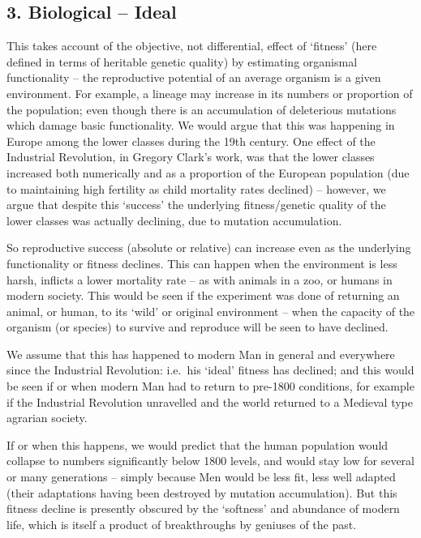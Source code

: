 \documentclass[
]{book}
\begin{document}
\hypertarget{biological-ideal}{%
\subsection*{3. Biological -- Ideal}\label{biological-ideal}}

This takes account of the objective, not differential, effect of `fitness' (here defined in terms of heritable genetic quality) by estimating organismal functionality -- the reproductive potential of an average organism is a given environment.
For example, a lineage may increase in its numbers or proportion of the population; even though there is an accumulation of deleterious mutations which damage basic functionality. We would argue that this was happening in Europe among the lower classes during the 19th century. One effect of the Industrial Revolution, in Gregory Clark's work, was that the lower classes increased both numerically and as a proportion of the European population (due to maintaining high fertility as child mortality rates declined) -- however, we argue that despite this `success' the underlying fitness/genetic quality of the lower classes was actually declining, due to mutation accumulation.

So reproductive success (absolute or relative) can increase even as the underlying functionality or fitness declines. This can happen when the environment is less harsh, inflicts a lower mortality rate -- as with animals in a zoo, or humans in modern society. This would be seen if the experiment was done of returning an animal, or human, to its `wild' or original environment -- when the capacity of the organism (or species) to survive and reproduce will be seen to have declined.

We assume that this has happened to modern Man in general and everywhere since the Industrial Revolution: i.e.~his `ideal' fitness has declined; and this would be seen if or when modern Man had to return to pre-1800 conditions, for example if the Industrial Revolution unravelled and the world returned to a Medieval type agrarian society.

If or when this happens, we would predict that the human population would collapse to numbers significantly below 1800 levels, and would stay low for several or many generations -- simply because Men would be less fit, less well adapted (their adaptations having been destroyed by mutation accumulation). But this fitness decline is presently obscured by the `softness' and abundance of modern life, which is itself a product of breakthroughs by geniuses of the past.
\end{document}
